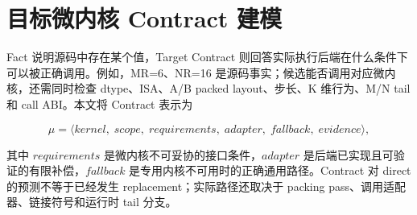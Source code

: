 \section{目标微内核 Contract 建模}

Fact 说明源码中存在某个值，Target Contract 则回答实际执行后端在什么条件下可以被正确调用。例如，MR=6、NR=16 是源码事实；候选能否调用对应微内核，还需同时检查 dtype、ISA、A/B packed layout、步长、K 维行为、M/N tail 和 call ABI。本文将 Contract 表示为

\begin{equation}
\mu
=
\langle kernel,\;scope,\;requirements,\;adapter,\;fallback,\;evidence\rangle,
\label{eq:chapter3-contract-model}
\end{equation}

其中 $requirements$ 是微内核不可妥协的接口条件，$adapter$ 是后端已实现且可验证的有限补偿，$fallback$ 是专用内核不可用时的正确通用路径。Contract 对 direct 的预测不等于已经发生 replacement；实际路径还取决于 packing pass、调用适配器、链接符号和运行时 tail 分支。

